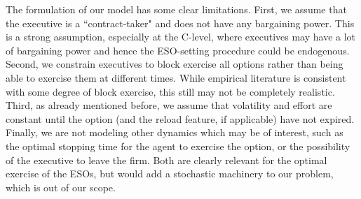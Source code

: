 The formulation of our model has some clear limitations. First, we assume that the executive is a ``contract-taker" and does not have any bargaining power. This is a strong assumption, especially at the C-level, where executives may have a lot of bargaining power and hence the ESO-setting procedure could be endogenous. Second, we constrain executives to block exercise all options rather than being able to exercise them at different times. While empirical literature is consistent with some degree of block exercise, %
this still may not be completely realistic. Third, as already mentioned before, we assume that volatility and effort are constant until the option (and the reload feature, if applicable) have not expired. Finally, we are not modeling other dynamics which may be of interest, such as the optimal stopping time for the agent to exercise the option, or the possibility of the executive to leave the firm. Both are clearly relevant for the optimal exercise of the ESOs, but would add a stochastic machinery to our problem, which is out of our scope. 




